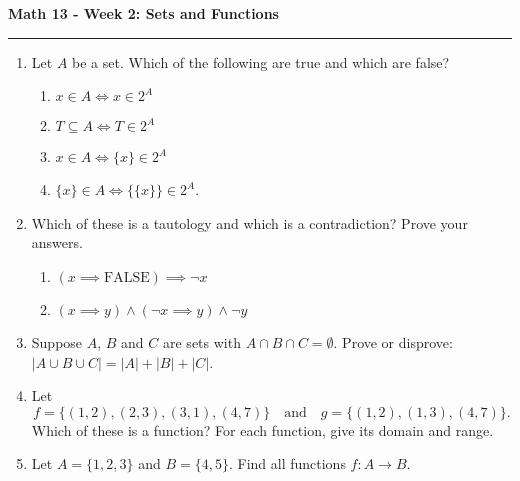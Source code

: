 \documentclass[12pt]{report}
\theoremstyle{definition}
\begin{document}
\begin{center}
{\bf \Large Math 13 - Week 2: Sets and Functions}
\vspace{0.2cm}
\hrule
\end{center}

\begin{enumerate}	

	\item Let $A$ be a set. Which of the following are true and which are false?
	\begin{enumerate}
		\item $x\in A \iff x\in 2^A$
		\item $T\subseteq A \iff T\in 2^A$
		\item $x\in A\iff \{x\}\in 2^A$
		\item $\{x\}\in A\iff \{\{x\}\}\in 2^A$.
	\end{enumerate}

	\vfill

	\item Which of these is a tautology and which is a contradiction? Prove your answers.
	\begin{enumerate}
		\item $(x\implies \text{FALSE})\implies \neg x$
		\item $(x\implies y)\land (\neg x\implies y)\land \neg y$
	\end{enumerate}

	\vfill

	\item Suppose $A$, $B$ and $C$ are sets with $A\cap B\cap C = \emptyset$. Prove or disprove: $|A\cup B\cup C| = |A|+|B|+|C|$.

	\vfill

	\item Let
	\[
		f = \{(1, 2), (2,3), (3,1), (4,7)\}\quad \text{and}\quad g = \{(1,2), (1,3), (4,7)\}.
	\]
	Which of these is a function? For each function, give its domain and range.

	\vfill

	\item Let $A = \{1,2,3\}$ and $B = \{4,5\}$. Find all functions $f: A\to B$.
	\vfill


\end{enumerate}
\end{document}
